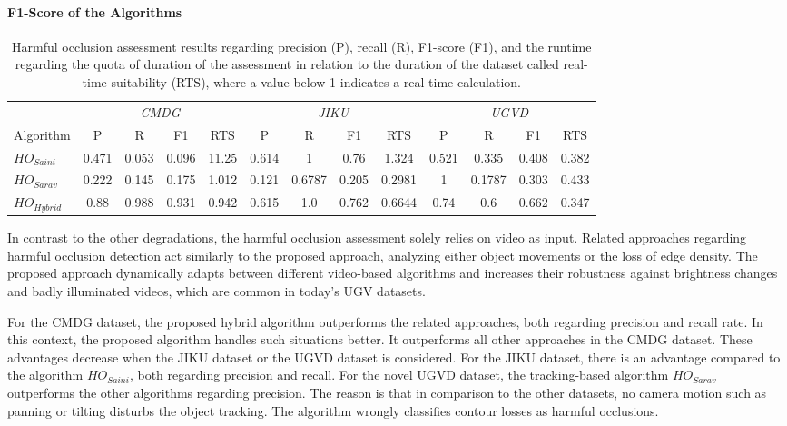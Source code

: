 \paragraph{F1-Score of the Algorithms}
\begin{table}[htb]
	\centering
	\begin{tabular}{lcccccccccccc}
		\toprule
		& \multicolumn{4}{c}{\textit{CMDG}} & \multicolumn{4}{c}{\textit{JIKU}} & \multicolumn{4}{c}{\textit{UGVD}}  \\
			\cmidrule(lr){2-5}
			\cmidrule(lr){6-9}
			\cmidrule(lr){10-13}
		Algorithm & P & R & F1 & RTS & P & R & F1 & RTS & P & R & F1 & RTS  \\
		\midrule
		$HO_{Saini}$ & 0.471 & 0.053 & 0.096 & 11.25 & 0.614 & 1 & 0.76 & 1.324 & 0.521& 0.335 & 0.408 & 0.382 \\
		$HO_{Sarav}$ & 0.222 & 0.145 & 0.175 & 1.012 & 0.121 & 0.6787 & 0.205 & 0.2981 & 1 & 0.1787 & 0.303 & 0.433\\
		\midrule
		$HO_{Hybrid}$ & 0.88 & 0.988 & 0.931 & 0.942 & 0.615 & 1.0 & 0.762 & 0.6644 & 0.74& 0.6& 0.662 & 0.347 \\
	
		\bottomrule
	\end{tabular}
	\caption[Evaluation results for harmful occlusion detection algorithms.]{Harmful occlusion assessment results regarding precision (P), recall (R), F1-score (F1), and the runtime regarding the quota of duration of the assessment in relation to the duration of the dataset called real-time suitability (RTS), where a value below 1 indicates a real-time calculation.}
	\label{tab:556_eval_harmful_occlusion_table}
\end{table}
In contrast to the other degradations, the harmful occlusion assessment solely relies on video as input. Related approaches regarding harmful occlusion detection act similarly to the proposed approach, analyzing either object movements or the loss of edge density. 
The proposed approach dynamically adapts between different video-based algorithms and increases their robustness against brightness changes and badly illuminated videos, which are common in today's \ac{UGV} datasets.

For the CMDG dataset, the proposed hybrid algorithm outperforms the related approaches, both regarding precision and recall rate. 
In this context, the proposed algorithm handles such situations better. 
It outperforms all other approaches in the CMDG dataset. 
These advantages decrease when the JIKU dataset or the UGVD dataset is considered. 
For the JIKU dataset, there is an advantage compared to the algorithm $HO_{Saini}$, both regarding precision and recall.
For the novel UGVD dataset, the tracking-based algorithm $HO_{Sarav}$ outperforms the other algorithms regarding precision.
The reason is that in comparison to the other datasets, no camera motion such as panning or tilting disturbs the object tracking.
The algorithm wrongly classifies contour losses as harmful occlusions.

